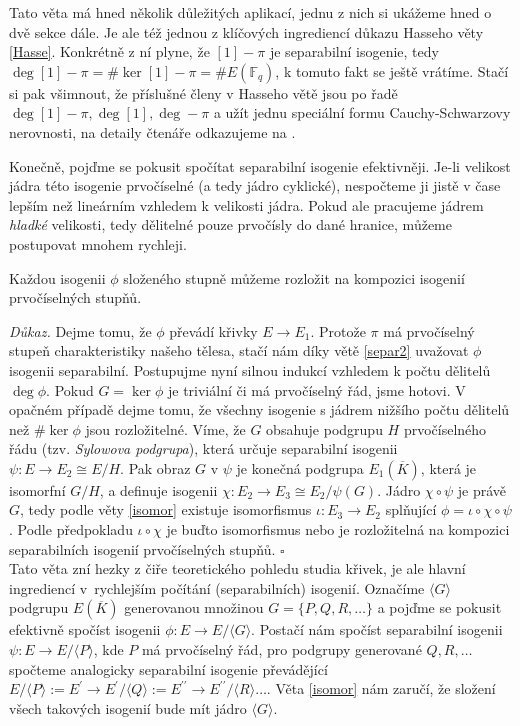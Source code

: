 \documentclass[12pt]{report}
\begin{document}
\begin{poznamka}
Tato věta má hned několik důležitých aplikací, jednu z nich si ukážeme hned o dvě sekce dále. Je ale též jednou z klíčových ingrediencí důkazu Hasseho věty \ref{Hasse}. Konkrétně z ní plyne, že $[1]-\pi$ je separabilní isogenie, tedy $\deg [1]-\pi = \# \ker [1]-\pi = \# E(\mathbb{F}_q)$, k tomuto fakt se ještě vrátíme. Stačí si pak všimnout, že příslušné členy v Hasseho větě jsou po řadě $\deg [1] - \pi, \deg [1], \deg -\pi$ a užít jednu speciální formu Cauchy-Schwarzovy nerovnosti, na detaily čtenáře odkazujeme na \cite[Thm. V.1.1.]{Silverman}.
\end{poznamka}

Konečně, pojďme se pokusit spočítat separabilní isogenie efektivněji. Je-li velikost jádra této isogenie prvočíselné (a tedy jádro cyklické), nespočteme ji jistě v čase lepším než lineárním vzhledem k velikosti jádra. Pokud ale pracujeme jádrem \textit{hladké} velikosti, tedy dělitelné pouze prvočísly do dané hranice, můžeme postupovat mnohem rychleji. 

\begin{veta}\label{prvoo}
Každou isogenii $\phi$ složeného stupně můžeme rozložit na kompozici isogenií prvočíselných stupňů.
\end{veta}
\noindent \textit{Důkaz.} Dejme tomu, že  $\phi$ převádí křivky $E \longrightarrow E_1$. Protože $\pi$ má prvočíselný stupeň charakteristiky našeho tělesa, stačí nám díky větě \ref{separ2} uvažovat $\phi$ isogenii separabilní. Postupujme nyní silnou indukcí vzhledem k počtu dělitelů $\deg \phi$. Pokud $G = \ker \phi$ je triviální či má prvočíselný řád, jsme hotovi. V opačném případě dejme tomu, že všechny isogenie s jádrem nižšího počtu dělitelů než $\# \ker \phi$ jsou rozložitelné. Víme, že $G$ obsahuje podgrupu $H$ prvočíselného řádu (tzv. \textit{Sylowova podgrupa}), která určuje separabilní isogenii $\psi : E \longrightarrow E_2 \cong E/H$. Pak obraz $G$ v $\psi$ je konečná podgrupa $E_1 (\overline{K})$, která je isomorfní $G/H$, a definuje isogenii $\chi : E_2 \longrightarrow E_3 \cong E_2/\psi(G)$. Jádro $\chi \circ \psi$ je právě $G$, tedy podle věty \ref{isomor} existuje isomorfismus $\iota : E_3 \longrightarrow E_2$ splňující $\phi = \iota \circ \chi \circ \psi$. Podle předpokladu $\iota \circ \chi$ je buďto isomorfismus nebo je rozložitelná na kompozici separabilních isogenií prvočíselných stupňů. \hfill $\square$\\

Tato věta zní hezky z čiře teoretického pohledu studia křivek, je ale hlavní ingrediencí v~rychlejším počítání (separabilních) isogenií. Označíme $\langle G \rangle$ podgrupu $E(\overline{K})$ generovanou množinou $G = \lbrace P,Q,R,\dots \rbrace$ a pojďme se pokusit efektivně spočíst isogenii $\phi : E \longrightarrow E/ \langle G \rangle$. Postačí nám spočíst separabilní isogenii $\psi : E \longrightarrow E/\langle P \rangle$, kde $P$ má prvočíselný řád, pro podgrupy generované $Q,R, \dots$ spočteme analogicky separabilní isogenie převádějící $E/\langle P \rangle := E^\prime \longrightarrow E^\prime/\langle Q \rangle := E^{\prime \prime} \longrightarrow E^{\prime \prime}/\langle R \rangle \dots$. Věta \ref{isomor} nám zaručí, že složení všech takových isogenií bude mít jádro $\langle G \rangle$.
\end{document}
